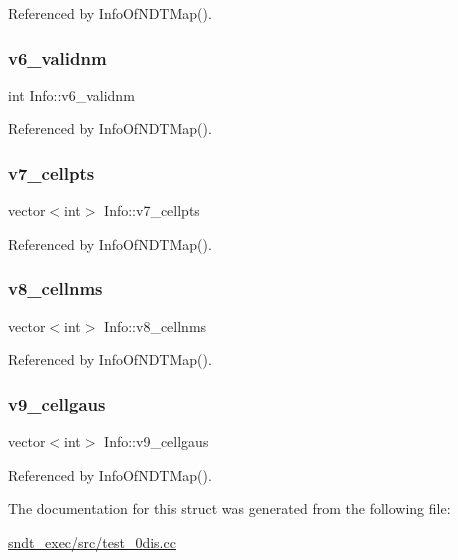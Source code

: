 Referenced by Info\+Of\+N\+D\+T\+Map().

\mbox{\label{structInfo_a00a940773f150d742999f3f57bfb3edd}} 
\subsubsection{\texorpdfstring{v6\+\_\+validnm}{v6\_validnm}}
{\footnotesize\ttfamily int Info\+::v6\+\_\+validnm}



Referenced by Info\+Of\+N\+D\+T\+Map().

\mbox{\label{structInfo_af0b8abdfd9f9cc34d38eea4f2482d87a}} 
\subsubsection{\texorpdfstring{v7\+\_\+cellpts}{v7\_cellpts}}
{\footnotesize\ttfamily vector$<$int$>$ Info\+::v7\+\_\+cellpts}



Referenced by Info\+Of\+N\+D\+T\+Map().

\mbox{\label{structInfo_a98320e8f2b02e1ede82716776c01eeeb}} 
\subsubsection{\texorpdfstring{v8\+\_\+cellnms}{v8\_cellnms}}
{\footnotesize\ttfamily vector$<$int$>$ Info\+::v8\+\_\+cellnms}



Referenced by Info\+Of\+N\+D\+T\+Map().

\mbox{\label{structInfo_a788cd85590e7824770a635228d3528d3}} 
\subsubsection{\texorpdfstring{v9\+\_\+cellgaus}{v9\_cellgaus}}
{\footnotesize\ttfamily vector$<$int$>$ Info\+::v9\+\_\+cellgaus}



Referenced by Info\+Of\+N\+D\+T\+Map().



The documentation for this struct was generated from the following file\+:\begin{DoxyCompactItemize}
\item 
\hyperlink{sndt__exec_2src_2test__0dis_8cc}{sndt\+\_\+exec/src/test\+\_\+0dis.\+cc}\end{DoxyCompactItemize}
